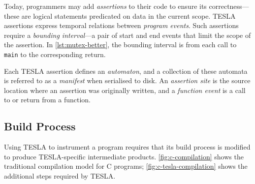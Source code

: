 Today, programmers may add \emph{assertions} to their code to ensure its
correctness---these are logical statements predicated on data in the current
scope. TESLA assertions express temporal relations between \emph{program
events}. Such assertions require a \emph{bounding interval}---a pair of start
and end events that limit the scope of the assertion. In
\autoref{lst:mutex-better}, the bounding interval is from each call to
\texttt{main} to the corresponding return.

Each TESLA assertion defines an \emph{automaton}, and a collection of
these automata is referred to as a \emph{manifest} when serialised to
disk. An \emph{assertion site} is the source location where an assertion
was originally written, and a \emph{function event} is a call to or
return from a function.

\subsection{Build Process} \label{sec:build-tesla}

Using TESLA to instrument a program requires that its build process is modified
to produce TESLA-specific intermediate products. \autoref{fig:c-compilation}
shows the traditional compilation model for C programs;
\autoref{fig:c-tesla-compilation} shows the additional steps required by TESLA.

